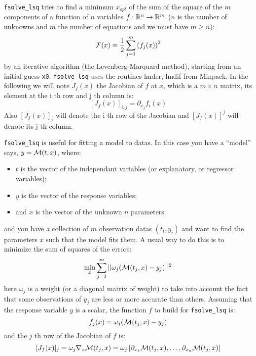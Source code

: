 \begin{mandescription}
\verb+fsolve_lsq+  tries to find a minimum $x_{opt}$ of the sum of the square of the $m$ components of a function
of $n$ variables $f: {\mathbb R}^n \rightarrow  {\mathbb R}^m$ ($n$ is the number of unknowns and $m$ the number of equations
and we must have $m \ge n$):
$$
    {\cal F}(x) \equiv \frac{1}{2} \sum_{j=1}^m \left(f_j(x)\right)^2
$$
by an iterative algorithm (the Levenberg-Marquard method), starting from an initial guess \verb+x0+.
\verb+fsolve_lsq+ uses the routines lmder, lmdif from Minpack. In the following we will note $J_f(x)$
the Jacobian of $f$ at $x$, which is a $m \times n$ matrix, its element at the i th row and j th column
is:
$$
[J_f(x)]_{i,j} = \partial_{x_j} f_i(x)
$$
Also $[J_f(x)]_i$ will denote the i th row of the Jacobian and  $[J_f(x)]^j$ will denote its j th column. 

\verb+fsolve_lsq+ is useful for fitting a model to datas. In this case you have a ``model'' 
says, $y = {\cal M}(t, x)$, where:
\begin{itemize}
\item $t$ is the vector of the independant variables (or explanatory, or regressor variables);
\item $y$ is the vector of the response variables; 
\item and $x$ is the vector of the unknown $n$ parameters.
\end{itemize}
and you have a collection of $m$ observation datas $(t_i, y_i)$ and want to find the parameters $x$ such 
that the model fits them. A usual way to do this is to minimize the sum of squares of the errors:
$$
   \min_x \sum_{j=1}^m || \omega_j ({\cal M}(t_j, x) - y_j) ||^2
$$
here $\omega_j$ is a weight (or a diagonal matrix of weight) to take into account the fact that some observations
of $y_j$ are less or more accurate than others. Assuming that the response variable $y$ is a scalar, the function $f$
to build for \verb+fsolve_lsq+ is:
$$
  f_j(x) =  \omega_j ({\cal M}(t_j, x) - y_j) 
$$ 
and the $j$ th row of the Jacobian of $f$ is:
$$
  [J_f(x)]_j = \omega_j \nabla_x {\cal M}(t_j, x) =  \omega_j \left[ \partial_{x_1}{\cal M}(t_j, x), \dots,
    \partial_{x_n}{\cal M}(t_j, x) \right]
$$



\end{mandescription}
